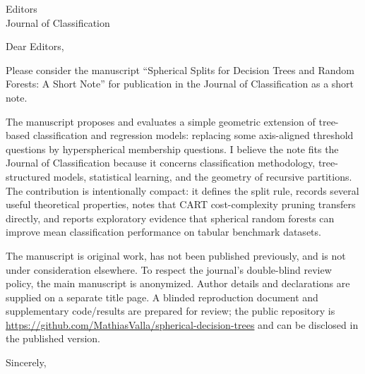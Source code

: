 \documentclass[12pt]{letter}
\begin{document}
\begin{letter}{Editors\\Journal of Classification}

\opening{Dear Editors,}

Please consider the manuscript ``Spherical Splits for Decision Trees and
Random Forests: A Short Note'' for publication in the Journal of
Classification as a short note.

The manuscript proposes and evaluates a simple geometric extension of
tree-based classification and regression models: replacing some
axis-aligned threshold questions by hyperspherical membership questions. I
believe the note fits the Journal of Classification because it concerns
classification methodology, tree-structured models, statistical learning, and
the geometry of recursive partitions. The contribution is intentionally
compact: it defines the split rule, records several useful theoretical
properties, notes that CART cost-complexity pruning transfers directly, and
reports exploratory evidence that spherical random forests can improve mean
classification performance on tabular benchmark datasets.

The manuscript is original work, has not been published previously, and is
not under consideration elsewhere. To respect the journal's double-blind
review policy, the main manuscript is anonymized. Author details and
declarations are supplied on a separate title page. A blinded reproduction
document and supplementary code/results are prepared for review; the public
repository is \url{https://github.com/MathiasValla/spherical-decision-trees}
and can be disclosed in the published version.

\closing{Sincerely,}

\end{letter}
\end{document}
